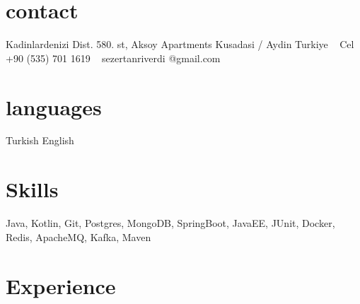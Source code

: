 \documentclass[]{cv-style}
\begin{document}
	\lastupdated


	\begin{aside}
%
		\section{contact}
		Kadinlardenizi Dist.
		580. st, Aksoy Apartments
		Kusadasi / Aydin
		Turkiye
		~
		Cel +90 (535) 701 1619
		~
		sezertanriverdi
		@gmail.com
%
		\section{languages}
		Turkish
		English
%
	\end{aside}


	\section{Skills}
	\vspace{-0.4cm}
	Java, Kotlin, Git, Postgres, MongoDB, SpringBoot, JavaEE, JUnit, Docker, Redis, ApacheMQ, Kafka, Maven


	\section{Experience}
\end{document}
